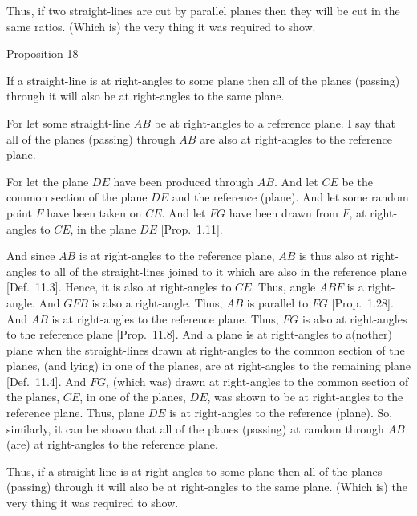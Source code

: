 \epsfysize=3in
\centerline{}

Thus, if two straight-lines are cut by parallel planes then
they will be cut in the same ratios. (Which is) the very thing it was required to
show.


\begin{center}
{\large Proposition 18}
\end{center}

If a straight-line is at right-angles to some plane then all of the planes (passing) through it will also be at right-angles to the same
plane.

For let some straight-line $AB$ be at right-angles to a reference plane.
I say that all of the planes (passing) through $AB$ are also at right-angles to 
the reference plane.

For let the plane $DE$ have been produced through $AB$. And let $CE$
be the common section of the plane $DE$ and the reference (plane).
And let some random point $F$ have been taken on $CE$. And let
$FG$ have been drawn from $F$, at right-angles to $CE$, in the plane $DE$
[Prop.~1.11].

And since $AB$ is at right-angles to the reference plane, $AB$ is thus also
at right-angles to all of the straight-lines joined to it which are also in the reference
plane [Def.~11.3]. Hence, it is also at right-angles to
$CE$. Thus, angle $ABF$ is a right-angle. And $GFB$ is also a right-angle.
Thus, $AB$ is parallel to $FG$ [Prop.~1.28].
And $AB$ is at right-angles to the reference plane. Thus, $FG$ is also
at right-angles to the reference plane [Prop.~11.8].
And a plane is at right-angles to a(nother) plane when the straight-lines drawn at
right-angles to the common section
of the planes,  (and lying) in one of the planes,
are at right-angles to the remaining plane [Def.~11.4].
And $FG$, (which was) drawn  at right-angles to the common
section of the planes, $CE$, in one of the planes, $DE$,  was shown  to be at right-angles to the reference plane. Thus, plane $DE$ is at right-angles
to the reference (plane). So, similarly, it can be shown that   all of the planes
(passing) at random through $AB$ (are) at right-angles to the
reference plane.

\centerline{}

Thus, if  a straight-line is at right-angles to some plane then all of the planes (passing) through it will also be at right-angles to the same
plane. (Which is) the very thing it was required to show.

